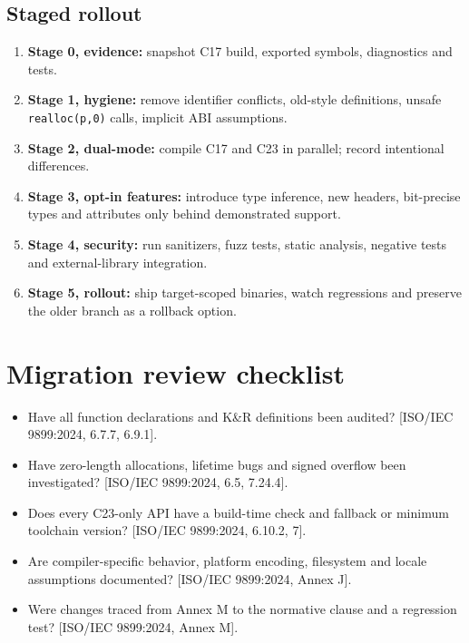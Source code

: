 \documentclass[10pt,letterpaper,oneside]{report}
\newcommand{\refcl}[1]{\textsf{\footnotesize[ISO/IEC 9899:2024, #1]}}
\begin{document}
\section{Staged rollout}
\begin{enumerate}
\item \textbf{Stage 0, evidence:} snapshot C17 build, exported symbols, diagnostics and tests.
\item \textbf{Stage 1, hygiene:} remove identifier conflicts, old-style definitions, unsafe \texttt{realloc(p,0)} calls, implicit ABI assumptions.
\item \textbf{Stage 2, dual-mode:} compile C17 and C23 in parallel; record intentional differences.
\item \textbf{Stage 3, opt-in features:} introduce type inference, new headers, bit-precise types and attributes only behind demonstrated support.
\item \textbf{Stage 4, security:} run sanitizers, fuzz tests, static analysis, negative tests and external-library integration.
\item \textbf{Stage 5, rollout:} ship target-scoped binaries, watch regressions and preserve the older branch as a rollback option.
\end{enumerate}
\chapter{Migration review checklist}
\begin{itemize}
\item Have all function declarations and K\&R definitions been audited? \refcl{6.7.7, 6.9.1}.
\item Have zero-length allocations, lifetime bugs and signed overflow been investigated? \refcl{6.5, 7.24.4}.
\item Does every C23-only API have a build-time check and fallback or minimum toolchain version? \refcl{6.10.2, 7}.
\item Are compiler-specific behavior, platform encoding, filesystem and locale assumptions documented? \refcl{Annex J}.
\item Were changes traced from Annex M to the normative clause and a regression test? \refcl{Annex M}.
\end{itemize}
\end{document}
